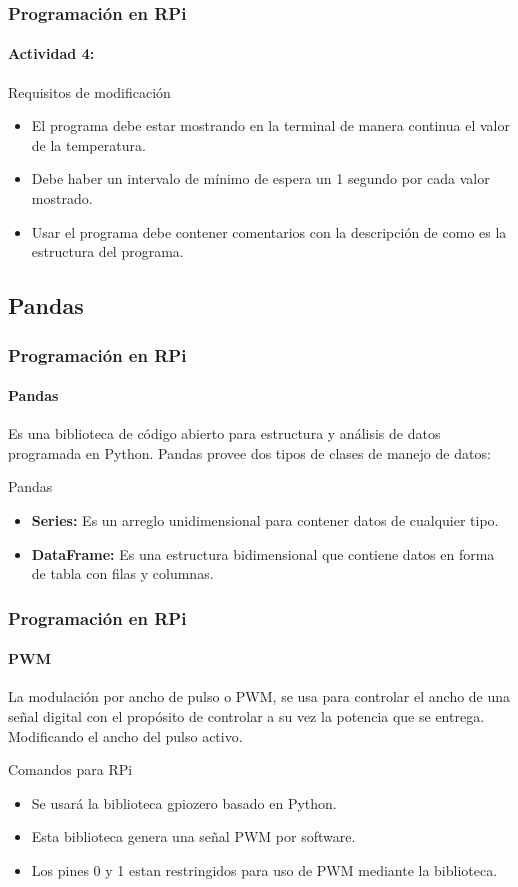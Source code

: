 \documentclass{beamer}
\begin{document}
	\begin{frame}
		\frametitle{Programación en RPi}
		\framesubtitle{Actividad 4:}
		\begin{mybox}{Requisitos de modificación}
			\begin{itemize}
				\item El programa debe estar mostrando en la terminal de manera continua el valor de la temperatura.
				\item Debe haber un intervalo de mínimo de espera un 1 segundo por cada valor mostrado.
				\item Usar el programa debe contener comentarios con la descripción de como es la estructura del programa.
			\end{itemize}
		\end{mybox}
	\end{frame}
	\subsection{Pandas}
	\begin{frame}
		\frametitle{Programación en RPi}
		\framesubtitle{Pandas}
		Es una biblioteca de código abierto para estructura y análisis de datos programada en Python.
		\newline
		Pandas provee dos tipos de clases de manejo de datos:
		\begin{mybox}{Pandas}
			 \begin{itemize}
			 	\item \textbf{Series:} Es un arreglo unidimensional para contener datos de cualquier tipo.
			 	\item \textbf{DataFrame:} Es una estructura bidimensional que contiene datos en forma de tabla con filas y columnas.
			 \end{itemize}
		\end{mybox}
	\end{frame}
	
	\begin{frame}
		\frametitle{Programación en RPi}
		\framesubtitle{PWM}
		La modulación por ancho de pulso o PWM, se usa para controlar el ancho de una señal digital con el propósito de controlar a su vez la potencia que se entrega. Modificando el ancho del pulso activo.
		\begin{mybox}{Comandos para RPi}
			\begin{itemize}
				\item Se usará la biblioteca gpiozero basado en Python.
				\item Esta biblioteca genera una señal PWM por software.
				\item Los pines 0 y 1 estan restringidos para uso de PWM mediante la biblioteca.
			\end{itemize}
		\end{mybox}
	\end{frame}
\end{document}
